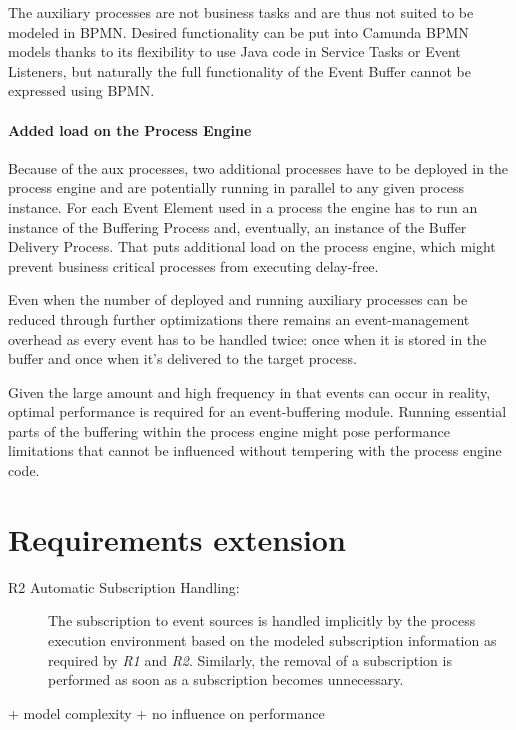 The auxiliary processes are not business tasks and are thus not suited to be modeled in BPMN.
Desired functionality can be put into Camunda BPMN models thanks to its flexibility to use Java code in Service Tasks or Event Listeners, but naturally the full functionality of the Event Buffer cannot be expressed using BPMN.

\paragraph{Added load on the Process Engine\newline}

Because of the aux processes, two additional processes have to be deployed in the process engine and are potentially running in parallel to any given process instance. For each Event Element used in a process the engine has to run an instance of the Buffering Process and, eventually, an instance of the Buffer Delivery Process.
That puts additional load on the process engine, which might prevent business critical processes from executing delay-free.

Even when the number of deployed and running auxiliary processes can be reduced through further optimizations there remains an event-management overhead as every event has to be handled twice: once when it is stored in the buffer and once when it's delivered to the target process.


Given the large amount and high frequency in that events can occur in reality, optimal performance is required for an event-buffering module.
Running essential parts of the buffering within the process engine might pose performance limitations that cannot be influenced without tempering with the process engine code.

\medskip \noindent
{}


\section{Requirements extension}\label{ch:ass:reqextension}
\begin{description}
	\item[R2 Automatic Subscription Handling:] 
	The subscription to event sources is handled implicitly by the process execution environment based on the modeled subscription information as required by \textit{R1} and \textit{R2}. Similarly, the removal of a subscription is performed as soon as a subscription becomes unnecessary.	
\end{description}

+ model complexity
+ no influence on performance

